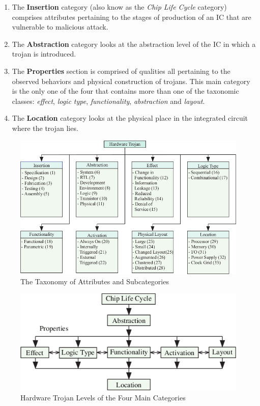 \begin{enumerate}
	\item The \textbf{Insertion} category (also know as the \textit{Chip Life Cycle} category) comprises attributes pertaining to the stages of production of an IC that are vulnerable to malicious attack.
	\item The \textbf{Abstraction} category looks at the abstraction level of the IC in which a trojan is introduced.
	\item The \textbf{Properties} section is comprised of qualities all pertaining to the observed behaviors and physical construction of trojans. This main category is the only one of the four that contains more than one of the taxonomic classes: \textit{effect}, \textit{logic type}, \textit{functionality}, \textit{abstraction} and \textit{layout}. 
	\item The \textbf{Location} category looks at the physical place in the integrated circuit where the trojan lies.
\end{enumerate}
\begin{figure}
	\centering
	\includegraphics[width=0.95\linewidth]{figures/HW_trojan}
	\caption[The Taxonomy of Attributes and Subcategories]{The Taxonomy of Attributes and Subcategories}
	\label{fig:HW_trojan}
\end{figure}
\begin{figure}
	\centering
	\includegraphics[width=0.7\linewidth]{figures/trojan_life_cycle}
	\caption[Hardware Trojan Levels of the Four Main Categories]{Hardware Trojan Levels of the Four Main Categories}
	\label{fig:trojan_life_cycle}
\end{figure}

